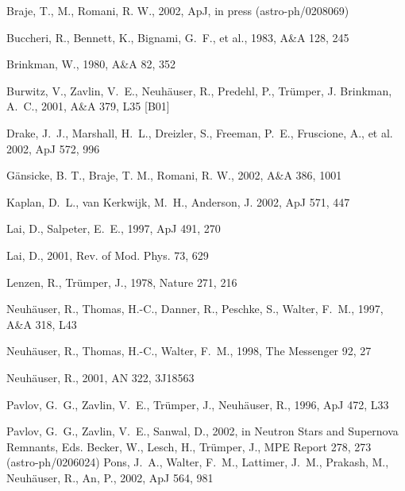 \documentclass[twocolumn]{aa}
\begin{document}
\begin{thebibliography}{}

               Braje, T., M., Romani, R. W., 
         2002, ApJ, in press (astro-ph/0208069)

               Buccheri, R., Bennett, K., Bignami, G.~F., et al., 
         1983, A\&A 128, 245 

	       Brinkman, W., 
	 1980, A\&A 82, 352


               Burwitz, V., Zavlin, V.~E., Neuh\"{a}user, R., Predehl, P., 
	       Tr\"{u}mper, J. Brinkman, A.~C.,
         2001, A\&A 379, L35 [B01]

               Drake, J.~J., Marshall, H.~L., Dreizler, S., Freeman, P.~E.,
	       Fruscione, A., et al. 
         2002, ApJ 572, 996

               G\"{a}nsicke, B. T., Braje, T. M., Romani, R. W.,
         2002, A\&A 386, 1001

               Kaplan, D.~L., van Kerkwijk, M.~H., Anderson, J. 
         2002, ApJ 571, 447

               Lai, D., Salpeter, E.~E., 
         1997, ApJ 491, 270

               Lai, D.,  
         2001, Rev. of Mod. Phys. 73, 629

               Lenzen, R., Tr\"umper, J., 
	 1978, Nature 271, 216


	       Neuh\"auser, R., Thomas, H.-C., Danner, R., Peschke, S., Walter, F.~M.,
	 1997, A\&A 318, L43

               Neuh\"auser, R., Thomas, H.-C., Walter, F.~M.,
         1998, The Messenger 92, 27

               Neuh\"auser, R., 
         2001, AN 322, 3J18563

               Pavlov, G.~G., Zavlin, V.~E., Tr\"umper, J., Neuh\"auser, R.,
         1996, ApJ 472, L33 

               Pavlov, G.~G., Zavlin, V.~E., Sanwal, D.,  
	 2002, in Neutron Stars and Supernova Remnants,
               Eds. Becker, W., Lesch, H., Tr\"{u}mper, J., MPE Report 278, 273
               (astro-ph/0206024)
               Pons, J.~A.,      
	       Walter, F.~M., 
               Lattimer, J.~M.,  
               Prakash, M., 
	       Neuh\"auser, R., 
	       An, P., 
         2002, ApJ 564, 981 


\end{thebibliography}
\end{document}
